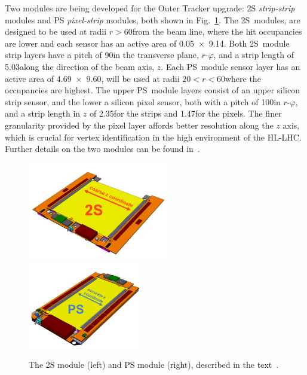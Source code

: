 Two \pT modules are being developed for the Outer Tracker upgrade: 2S \emph{strip-strip} modules and PS \emph{pixel-strip} modules, both shown in Fig.~\ref{fig:2Spsmodules}.
The 2S~modules, are designed to be used at radii $r>60$\cm from the beam line, where the hit occupancies are lower and each sensor has an active area of 0.05\cm~$\times$~9.14\cm.
Both 2S~module strip layers have a pitch of 90\mum in the transverse plane, $r$-$\varphi$, and a strip length of 5.03\cm along the direction of the beam axis, $z$.
Each PS~module sensor layer has an active area of 4.69\cm~$\times$~9.60\cm, will be used at radii $20<r<60$\cm where the occupancies are highest.
The upper PS~module layers consist of an upper silicon strip sensor, and the lower a silicon pixel sensor, both with a pitch of 100\mum in $r$-$\varphi$, and a strip length in $z$ of 2.35\cm for the strips and 1.47\mm for the pixels.
The finer granularity provided by the pixel layer affords better resolution along the $z$ axis, which is crucial for vertex identification in the high \PU environment of the HL-LHC.
Further details on the two \pT modules can be found in~\cite{CMS_Upgrade_TP,P2TrackerTDR}.
 
\begin{figure}[tp]
\centering
\includegraphics[width=0.55\textwidth,trim={0truecm 0truecm 0truecm 1truecm},clip]{figs/tk-upgrade/2S_assembled.png}
\hfill
\includegraphics[width=0.44\textwidth,trim={0truecm 0truecm 0truecm 1truecm},clip]{figs/tk-upgrade/PS_assembled.png}
\caption{The 2S module (left) and PS module (right), described in the text~\cite{P2TrackerTDR}.}
\label{fig:2Spsmodules}
\end{figure}

